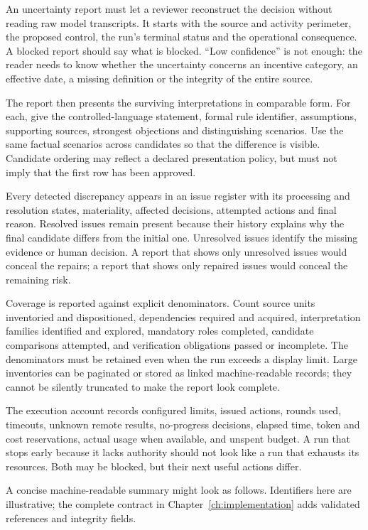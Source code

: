 \documentclass[12pt,a4paper,oneside,openany]{book}
\begin{document}
An uncertainty report must let a reviewer reconstruct the decision without
reading raw model transcripts. It starts with the source and activity perimeter,
the proposed control, the run's terminal status and the operational consequence.
A blocked report should say what is blocked. ``Low confidence'' is not enough:
the reader needs to know whether the uncertainty concerns an incentive category,
an effective date, a missing definition or the integrity of the entire source.

The report then presents the surviving interpretations in comparable form. For
each, give the controlled-language statement, formal rule identifier, assumptions,
supporting sources, strongest objections and distinguishing scenarios. Use the
same factual scenarios across candidates so that the difference is visible.
Candidate ordering may reflect a declared presentation policy, but must not imply
that the first row has been approved.

Every detected discrepancy appears in an issue register with its processing and
resolution states, materiality, affected decisions, attempted actions and final
reason. Resolved issues remain present because their history explains why the
final candidate differs from the initial one. Unresolved issues identify the
missing evidence or human decision. A report that shows only unresolved issues
would conceal the repairs; a report that shows only repaired issues would conceal
the remaining risk.

Coverage is reported against explicit denominators. Count source units inventoried
and dispositioned, dependencies required and acquired, interpretation families
identified and explored, mandatory roles completed, candidate comparisons
attempted, and verification obligations passed or incomplete. The denominators
must be retained even when the run exceeds a display limit. Large inventories
can be paginated or stored as linked machine-readable records; they cannot be
silently truncated to make the report look complete.

The execution account records configured limits, issued actions, rounds used,
timeouts, unknown remote results, no-progress decisions, elapsed time, token and
cost reservations, actual usage when available, and unspent budget. A run that
stops early because it lacks authority should not look like a run that exhausts
its resources. Both may be blocked, but their next useful actions differ.

A concise machine-readable summary might look as follows. Identifiers here are
illustrative; the complete contract in Chapter~\ref{ch:implementation} adds
validated references and integrity fields.
\end{document}
